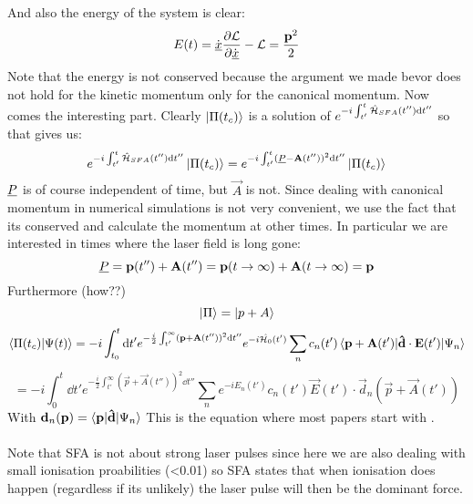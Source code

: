 And also the energy of the system is clear:
\begin{equation*}
    E(t) = \dot{\underline{x}}\frac{\partial \mathcal{L}}{\partial \dot{\underline{x}}}-\mathcal{L} = \frac{\mathbf{p}^2}{2}
\end{equation*}
Note that the energy is not conserved because the argument we made bevor does not hold for the kinetic momentum only for the canonical momentum.
Now comes the interesting part. Clearly $\ket{\Pi(t_c)}$ is a solution of $e^{-i \int_{t'}^{t} \hat{\mathcal{H}}_{SFA}(t'') \mathrm{d} t''}$ so that gives us:
\begin{equation*}
    e^{-i \int_{t'}^{t} \hat{\mathcal{H}}_{SFA}(t'') \mathrm{d} t''}\ket{\Pi(t_c)} = e^{-i \int_{t'}^{t} (\underline{P} - \mathbf{A}(t''))^2 \mathrm{d} t''}\ket{\Pi(t_c)}
\end{equation*}
$\underline{P}$ is of course independent of time, but $\vec{A}$ is not. 
Since dealing with canonical momentum in numerical simulations is not very convenient, we use the fact that its conserved and calculate the momentum at other times.
In particular we are interested in times where the laser field is long gone:
\begin{equation*}
    \underline{P} = \mathbf{p}(t'') + \mathbf{A}(t'') = \mathbf{p}(t\rightarrow \infty) + \mathbf{A}(t\rightarrow \infty) = \mathbf{p}
\end{equation*}
Furthermore (how??)
\begin{equation*}
    \ket{\Pi} = \ket{p+A}
\end{equation*}
\begin{equation}
    \braket{\Pi(t_c)|\Psi(t)} = -i \int_{t_0}^{t} \mathrm{d} t' e^{-\frac{i}{2}\int_{t'}^{\infty}(\mathbf{p}+\mathbf{A}(t''))^2\mathrm{d} t''}e^{-i \hat{\mathcal{H}_0} (t')} \sum_{n}c_n(t')\braket{\mathbf{p}+\mathbf{A}(t')|\mathbf{\hat{d}}\cdot\mathbf{E}(t')|\Psi_n}
\end{equation}
\begin{equation*}
    = -i \int_{0}^{t} \dd t' e^{-\frac{i}{2}\int_{t'}^{\infty}(\vec{p}+\vec{A}(t''))^2\dd t''} \sum_{n}e^{-iE_n(t')}c_n(t')\vec{E}(t')\cdot\vec{d}_n(\vec{p}+\vec{A}(t'))
\end{equation*}
With $\mathbf{d}_n(\mathbf{p}) = \braket{\mathbf{p}|\mathbf{\hat{d}}|\Psi_n}$
This is the equation where most papers start with \cite{Theory_NPS}.\\\\
Note that SFA is not about strong laser pulses since here we are also dealing with small ionisation proabilities (<0.01) so SFA states that when ionisation does happen (regardless if its unlikely) the laser pulse will then be the dominant force.


